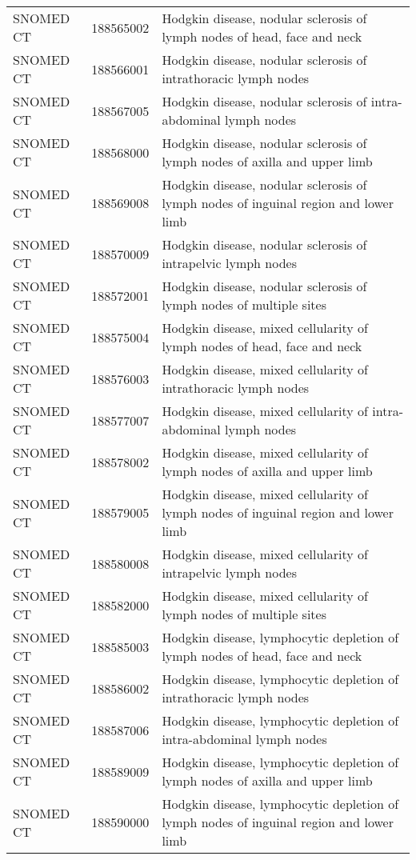 \begin{longtable}{p{}p{}p{}}
  SNOMED CT & 188565002 & Hodgkin disease, nodular sclerosis of lymph nodes of head, face and neck \\ 
  SNOMED CT & 188566001 & Hodgkin disease, nodular sclerosis of intrathoracic lymph nodes \\ 
  SNOMED CT & 188567005 & Hodgkin disease, nodular sclerosis of intra-abdominal lymph nodes \\ 
  SNOMED CT & 188568000 & Hodgkin disease, nodular sclerosis of lymph nodes of axilla and upper limb \\ 
  SNOMED CT & 188569008 & Hodgkin disease, nodular sclerosis of lymph nodes of inguinal region and lower limb \\ 
  SNOMED CT & 188570009 & Hodgkin disease, nodular sclerosis of intrapelvic lymph nodes \\ 
  SNOMED CT & 188572001 & Hodgkin disease, nodular sclerosis of lymph nodes of multiple sites \\ 
  SNOMED CT & 188575004 & Hodgkin disease, mixed cellularity of lymph nodes of head, face and neck \\ 
  SNOMED CT & 188576003 & Hodgkin disease, mixed cellularity of intrathoracic lymph nodes \\ 
  SNOMED CT & 188577007 & Hodgkin disease, mixed cellularity of intra-abdominal lymph nodes \\ 
  SNOMED CT & 188578002 & Hodgkin disease, mixed cellularity of lymph nodes of axilla and upper limb \\ 
  SNOMED CT & 188579005 & Hodgkin disease, mixed cellularity of lymph nodes of inguinal region and lower limb \\ 
  SNOMED CT & 188580008 & Hodgkin disease, mixed cellularity of intrapelvic lymph nodes \\ 
  SNOMED CT & 188582000 & Hodgkin disease, mixed cellularity of lymph nodes of multiple sites \\ 
  SNOMED CT & 188585003 & Hodgkin disease, lymphocytic depletion of lymph nodes of head, face and neck \\ 
  SNOMED CT & 188586002 & Hodgkin disease, lymphocytic depletion of intrathoracic lymph nodes \\ 
  SNOMED CT & 188587006 & Hodgkin disease, lymphocytic depletion of intra-abdominal lymph nodes \\ 
  SNOMED CT & 188589009 & Hodgkin disease, lymphocytic depletion of lymph nodes of axilla and upper limb \\ 
  SNOMED CT & 188590000 & Hodgkin disease, lymphocytic depletion of lymph nodes of inguinal region and lower limb \\ 

\end{longtable}
